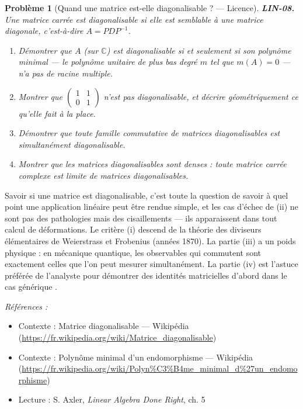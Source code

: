 \documentclass[11pt]{article}
\newtheorem{problem}{Problème}
\newenvironment{refs}{\par\small\noindent\emph{Références :}\begin{itemize}\setlength\itemsep{0pt}}{\end{itemize}\normalsize}
\begin{document}
\bigskip

\begin{problem}[{Quand une matrice est-elle diagonalisable ? --- Licence}]
\textbf{LIN-08.} Une matrice carrée est \textit{diagonalisable} si elle est semblable
à une matrice diagonale, c'est-à-dire $A = PDP^{-1}$.
\begin{enumerate}
\item[(i)] Démontrer que $A$ (sur $\mathbb{C}$) est
diagonalisable si et seulement si son polynôme minimal --- le polynôme unitaire de plus bas degré
$m$ tel que $m(A) = 0$ --- n'a pas de racine multiple.
\item[(ii)] Montrer que
$\begin{pmatrix} 1 & 1 \\ 0 & 1 \end{pmatrix}$ n'est pas diagonalisable, et décrire
géométriquement ce qu'elle fait à la place.
\item[(iii)] Démontrer que toute famille commutative de matrices
diagonalisables est \textit{simultanément} diagonalisable.
\item[(iv)] Montrer que les matrices diagonalisables sont
denses : toute matrice carrée complexe est limite de matrices diagonalisables.
\end{enumerate}

\end{problem}

\noindent Savoir si une matrice est diagonalisable, c'est toute la question de savoir à quel
point une application linéaire peut être rendue simple, et les cas d'échec de (ii) ne sont pas des
pathologies mais des cisaillements --- ils apparaissent dans tout calcul de déformations. Le critère
(i) descend de la théorie des diviseurs élémentaires de Weierstrass et Frobenius (années 1870). La
partie (iii) a un poids physique : en mécanique quantique, les observables qui commutent sont
exactement celles que l'on peut mesurer simultanément. La partie (iv) est l'astuce préférée de
l'analyste pour démontrer des identités matricielles \og{} d'abord dans le cas générique \fg{}.

\begin{refs}
\item Contexte : Matrice diagonalisable --- Wikipédia (\url{https://fr.wikipedia.org/wiki/Matrice_diagonalisable})
\item Contexte : Polynôme minimal d'un endomorphisme --- Wikipédia (\url{https://fr.wikipedia.org/wiki/Polyn%C3%B4me_minimal_d%27un_endomorphisme})
\item Lecture : S. Axler, \textit{Linear Algebra Done Right}, ch. 5
\end{refs}
\end{document}
